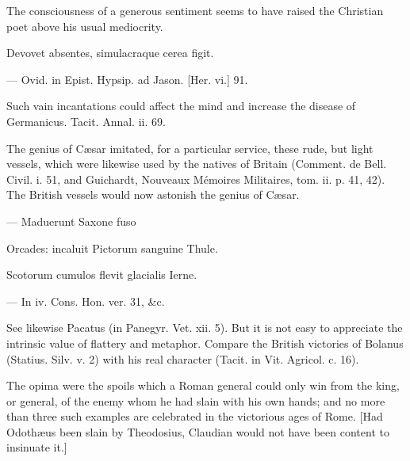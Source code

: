 The consciousness of a generous sentiment seems to have raised the Christian poet above his usual mediocrity.

Devovet absentes, simulacraque cerea figit.

\texthebrew{—} Ovid. in Epist. Hypsip. ad Jason. [Her. vi.] 91.

Such vain incantations could affect the mind and increase the disease of Germanicus. Tacit. Annal. ii. 69.

The genius of Cæsar imitated, for a particular service, these rude, but light vessels, which were likewise used by the natives of Britain (Comment. de Bell. Civil. i. 51, and Guichardt, Nouveaux Mémoires Militaires, tom. ii. p. 41, 42). The British vessels would now astonish the genius of Cæsar.

\texthebrew{—} Maduerunt Saxone fuso

Orcades: incaluit Pictorum sanguine Thule.

Scotorum cumulos flevit glacialis Ierne.

\texthebrew{—} In iv. Cons. Hon. ver. 31, \&c.

See likewise Pacatus (in Panegyr. Vet. xii. 5). But it is not easy to appreciate the intrinsic value of flattery and metaphor. Compare the British victories of Bolanus (Statius. Silv. v. 2) with his real character (Tacit. in Vit. Agricol. c. 16).

The opima were the spoils which a Roman general could only win from the king, or general, of the enemy whom he had slain with his own hands; and no more than three such examples are celebrated in the victorious ages of Rome. [Had Odothæus been slain by Theodosius, Claudian would not have been content to insinuate it.]
